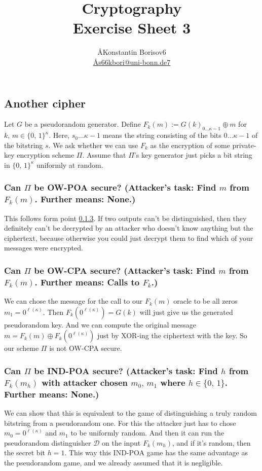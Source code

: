 \documentclass{article}
\title{Cryptography \\ Exercise Sheet 3}
\author{
  \AA{Konstantin Borisov}{6} \\
  \href{mailto:\AA{s66kbori@uni-bonn.de}{7}}{\AA{s66kbori@uni-bonn.de}{7}}
}
\begin{document}
  \maketitle

  \setcounter{section}{3}
  \subsection{Another cipher}
  \begin{centerframebox}
    Let $G$ be a pseudorandom generator. Define $F_k(m) := G(k)_{0\dots\kappa-1} \oplus m$ for
    $k,\, m \in \{0,\, 1\}^\kappa$.
    Here, $s_0 \dots \kappa-1$ means the string consisting of the bits $0 \dots \kappa-1$
    of the bitstring $s$. We ask whether we can use $F_k$ as the encryption of
    some private-key encryption scheme $\Pi$. Assume that $\Pi$'s key generator
    just picks a bit string in $\{0,\, 1\}^\kappa$
    uniformly at random.
  \end{centerframebox}
  \subsubsection{Can $\Pi$ be OW-POA secure? (Attacker's task: Find $m$ from $F_k(m)$. Further means: None.)}
  This follows form point \ref{sec:indpoasec}.
  If two outputs can't be distinguished, then they definitely can't be decrypted by an attacker who doesn't know anything but the ciphertext, because otherwise you could just decrypt them to find which of your messages were encrypted.

  \subsubsection{Can $\Pi$ be OW-CPA secure? (Attacker's task: Find $m$ from $F_k(m)$. Further means: Calls to $F_k$.)}
  We can chose the message for the call to our $F_k(m)$ oracle to be all zeros $m_1 = 0^{\ell(\kappa)}$.
  Then $F_k\left(0^{\ell(\kappa)}\right) = G(k)$ will just give us the generated pseudorandom key.
  And we can compute the original message $m = F_k(m) \oplus F_k\left(0^{\ell(\kappa)}\right)$ just by XOR-ing the ciphertext with the key.
  So our scheme $\Pi$ is not OW-CPA secure.

  \subsubsection{Can $\Pi$ be IND-POA secure? (Attacker's task: Find $h$ from $F_k(m_h)$ with attacker chosen $m_0,\, m_1$ where $h \in \{0,\, 1\}$. Further means: None.)}
  \label{sec:indpoasec}
  We can show that this is equivalent to the game of distinguishing a truly random bitstring from a pseudorandom one.
  For this the attacker just has to chose $m_0 = 0^{\ell(\kappa)}$ and $m_1$ to be uniformly random.
  And then it can run the pseudorandom distinguisher $\mathcal{D}$ on the input $F_k(m_h)$,
  and if it's random, then the secret bit $h = 1$.
  This way this IND-POA game has the same advantage as the pseudorandom game, and we already assumed that it is negligible.
\end{document}
